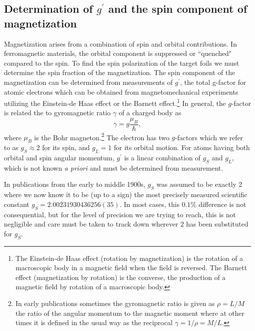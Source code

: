 \documentclass[preprint,12pt]{elsarticle}
\begin{document}
\subsection{Determination of $g^{\prime}$ and the spin component of magnetization}
Magnetization arises from a combination of spin and orbital contributions. In ferromagnetic materials, the orbital component is suppressed  or ``quenched" compared to the spin. To find the spin polarization of the target foils we must determine the spin fraction of the magnetization. The spin component of the magnetization can be determined from measurements of $g^{\prime}$, the total g-factor for atomic electrons which can be obtained from magnetomechanical experiments utilizing the Einstein-de Haas effect or the Barnett effect.\footnote{The Einstein-de Haas effect (rotation by magnetization) is the rotation of a macroscopic body in a magnetic field when the field is reversed\cite{Richardson1908, Scott1962}. The Barnett effect (magnetization by rotation) is the converse, the production of a magnetic field by rotation of a macroscopic body\cite{Barnett1909, Barnett1944}.} In general, the $g$-factor is related the to gyromagnetic ratio $\gamma$ of a charged body as 
\begin{equation}
\gamma=g\frac{\mu_B}{\hbar},
\label{eq:gyro}
\end{equation}
where $\mu_B$ is the Bohr magneton.\footnote{In early publications sometimes the gyromagnetic ratio is given as $\rho=L/M$ the ratio of the angular momentum to the magnetic moment where at other times it is defined in the usual way as the reciprocal $\gamma=1/\rho=M/L$.} The electron has two $g$-factors which we refer to as $g_{S}\approx2$ for its spin, and $g_{L}=1$ for its orbital motion. For atoms having both orbital and spin angular momentum, $g^{\prime}$ is a linear combination of $g_{S}$ and $g_{L}$, which is not known {\it a priori} and must be determined from measurement.

In publications from the early to middle 1900s, $g_{S}$ was assumed to be exactly 2 where we now know it to be (up to a sign) the most precisely measured scientific constant $g_{S}=2.00231930436256(35)$. In most cases, this $0.1\%$ difference is not consequential, but for the level of precision we are trying to reach, this is not negligible and care must be taken to track down wherever 2 has been substituted for $g_{S}$. 
\end{document}
